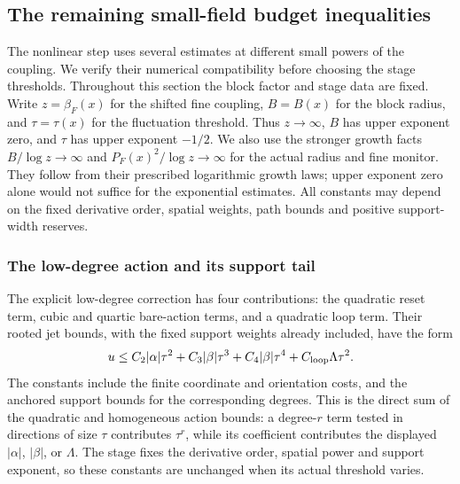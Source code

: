 \subsection{The remaining small-field budget inequalities}
\label{sec:small-field-budget-selection}
The nonlinear step uses several estimates at different small powers
of the coupling. We verify their numerical compatibility before
choosing the stage thresholds. Throughout this section the block
factor and stage data are fixed. Write $z=\beta_F(x)$ for the shifted
fine coupling, $B=B(x)$ for the block radius, and $\tau=\tau(x)$ for
the fluctuation threshold. Thus $z\to\infty$, $B$ has upper exponent
zero, and $\tau$ has upper exponent $-1/2$. We also use the
stronger growth facts $B/\log z\to\infty$ and
$P_F(x)^2/\log z\to\infty$ for the actual radius and fine monitor.
They follow from their prescribed logarithmic growth laws; upper
exponent zero alone would not suffice for the exponential estimates.
All constants may depend
on the fixed derivative order, spatial weights, path bounds and
positive support-width reserves.

\subsubsection{The low-degree action and its support tail}
The explicit low-degree correction has four contributions: the
quadratic reset term, cubic and quartic bare-action terms, and a
quadratic loop term. Their rooted jet bounds, with the fixed support
weights already included, have the form
\begin{equation}\label{eq:small-field-four-costs}
       u\le C_2|\alpha|\tau^2
                  +C_3|\beta|\tau^3
                  +C_4|\beta|\tau^4+C_{\rm loop}\Lambda\tau^2.
\end{equation}
The constants include the finite coordinate and orientation costs,
and the anchored support bounds for the corresponding degrees.
This is the direct sum of the quadratic and homogeneous action
bounds: a degree-$r$ term tested in directions of size $\tau$
contributes $\tau^r$, while its coefficient contributes the displayed
$|\alpha|$, $|\beta|$, or $\Lambda$. The stage fixes the derivative
order, spatial power and support exponent, so these constants are
unchanged when its actual threshold varies.

